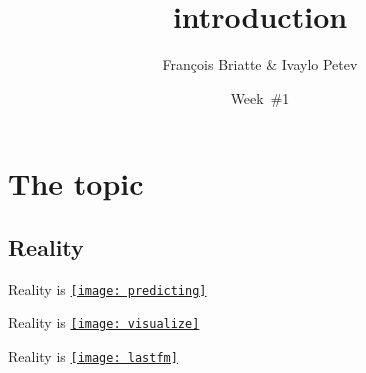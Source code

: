 \documentclass[t]{beamer}
\title{introduction}
\author{François Briatte \& Ivaylo Petev}
\date{Week~\#1}
\begin{document}

  \section{The topic}

  \subsection{Reality}

  \begin{frame}[t]{Reality is }
    \href{http://articles.latimes.com/2010/aug/21/local/la-me-predictcrime-20100427-1}{\texttt{[image: predicting]}}
  \end{frame}

  \begin{frame}[t]{Reality is }
    \href{http://www.bricoleurbanism.org/whimsicality/urban-fabric-form-comparison/}{\texttt{[image: visualize]}}
  \end{frame}

  \begin{frame}[t]{Reality is }
    \href{http://www.last.fm/user/phnk1/library}{\texttt{[image: lastfm]}}
  \end{frame}

\end{document}
